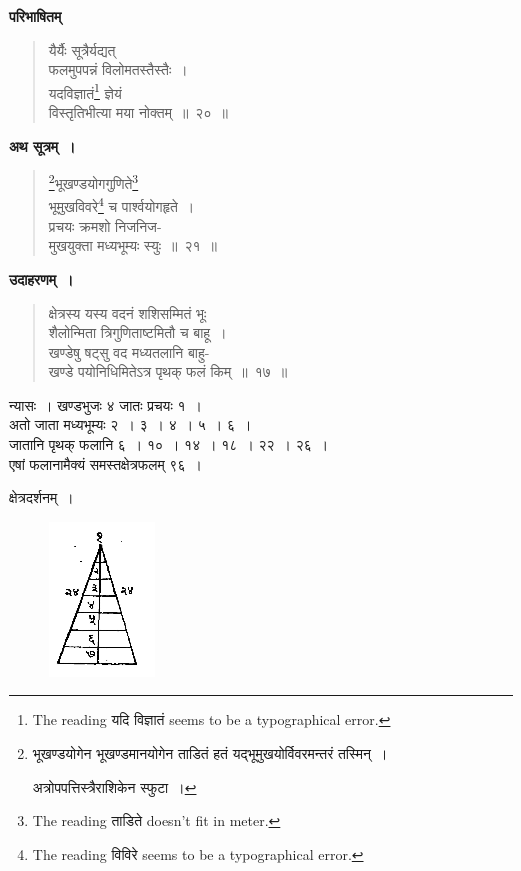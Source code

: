 \documentclass[11pt, openany]{book}
\begin{document}
\textbf{परिभाषितम् \textendash } 
\begin{quote}
    \bs 
     यैर्यैः सूत्रैर्यद्यत् \\
     फलमुपपन्नं विलोमतस्तैस्तैः~।\\
यदविज्ञातं\footnote{The reading यदि विज्ञातं seems to be a typographical error.} ज्ञेयं \\
विस्तृतिभीत्या मया नोक्तम्~॥~२०~॥
\end{quote}

\newpage
\setcounter{footnote}{0}
 \textbf{अथ सूत्रम्~।} 
\begin{quote}
    \bs 
    \footnote{भूखण्डयोगेन भूखण्डमानयोगेन ताडितं हतं यद्भूमुखयोर्विवरमन्तरं तस्मिन्~। 
\vspace{1mm}

\hspace{4mm} अत्रोपपत्तिस्त्रैराशिकेन स्फुटा~।}भूखण्डयोगगुणिते\footnote{The reading ताडिते doesn't fit in meter.} \\
 भूमुखविवरे\footnote{The reading विविरे seems to be a typographical error.} च पार्श्वयोगहृते~।\\
प्रचयः क्रमशो निजनिज-\\
मुखयुक्ता मध्यभूम्यः स्युः~॥~२१~॥
\end{quote}
 
 \textbf{उदाहरणम्~।} 
\begin{quote}
    \bqt 
    क्षेत्रस्य यस्य वदनं शशिसम्मितं भूः \\
    शैलोन्मिता त्रिगुणिताष्टमितौ च बाहू~।\\
खण्डेषु षट्सु वद मध्यतलानि बाहु-\\
खण्डे पयोनिधिमितेऽत्र पृथक् फलं किम्~॥~१७~॥
\end{quote}

 न्यासः~। खण्डभुजः ४ जातः प्रचयः १~। \\
\indent अतो जाता मध्यभूम्यः २~। ३~। ४~। ५~। ६~। \\
\indent जातानि पृथक् फलानि ६~। १०~। १४~। १८~। २२~। २६~। \\
\indent एषां फलानामैक्यं समस्तक्षेत्रफलम् ९६~। 

\newpage%

 क्षेत्रदर्शनम्~। 
\vspace{-2mm}

\begin{figure}[h!]
    \centering
    \includegraphics[scale=0.7]{graphics/capture24.png}
\end{figure}
\end{document}
